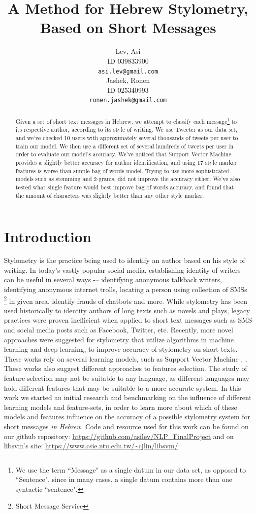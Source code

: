 \documentclass[a4paper]{article}
\author{Lev, Asi \\
	ID 039833900 \\
	{\tt asi.lev@gmail.com} \\
\And
	Jashek, Ronen\\
	ID 025340993\\
	{\tt ronen.jashek@gmail.com} \\	
}
\title{A Method for Hebrew Stylometry, Based on Short Messages}
\date{}
\begin{document}
\maketitle
\begin{abstract}

Given a set of short text messages in Hebrew, we attempt to classify each message\footnote{We use the term ``Message" as a single datum in our data set, as opposed to ``Sentence", since in many cases, a single datum contains more than one syntactic ``sentence".} to its respective author, according to its style of writing.
We use Tweeter as our data set, and we've checked 10 users with approximately several thousands of tweets per user to train our model.
We then use a different set of several hundreds of tweets per user in order to evaluate our model's accuracy.
We've noticed that Support Vector Machine provides a slightly better accuracy for author identification, and using 17 style marker features is worse than simple bag of words model. Trying to use more sophisticated models such as stemming and 2-grams, did not improve the accuracy either. We've also tested what single feature would best improve bag of words accuracy, and found that the amount of characters was slightly better than any other style marker.
\end{abstract}
\section{Introduction}

Stylometry is the practice being used to identify an author based on his style of writing. In today's vastly popular social media, establishing identity of writers can be useful in several ways -– identifying anonymous talkback writers, identifying anonymous internet trolls, locating a person using collection of SMSs \footnote{Short Message Service} in given area, identify frauds of chatbots and more.
While stylometry has been used historically to identity authors of long texts such as novels and plays, legacy practices were proven inefficient when applied to short text messages such as SMS and social media posts such as Facebook, Twitter, etc. \citep{green}
Recently, more novel approaches were suggested for stylometry that utilize algorithms in machine learning and deep learning, to improve accuracy of stylometry on short texts.
These works rely on several learning models, such as Support Vector Machine \citep{green}, \citep{schwartz}.
These works also suggest different approaches to features selection. The study of feature selection may not be suitable to any language, as different languages may hold different features that may be suitable to a more accurate system.
In this work we started an initial research and benchmarking on the influence of different learning models and feature-sets, in order to learn more about which of these models and features influence on the accuracy of a possible stylometry system for short messages \emph{in Hebrew}.
Code and resource used for this work can be found on our github repository: \url{https://github.com/asilev/NLP\_FinalProject} and on libsvm's site: \url{https://www.csie.ntu.edu.tw/~cjlin/libsvm/} \citep{chang}
\end{document}
